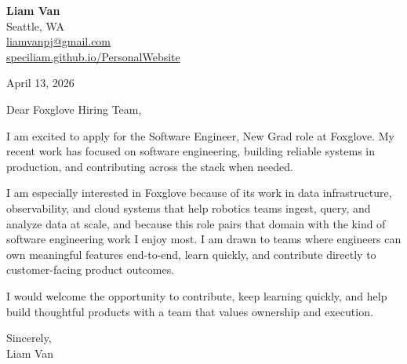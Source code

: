 \documentclass[letterpaper,11pt]{article}
\begin{document}
\begin{flushleft}
\textbf{\Large Liam Van} \\
Seattle, WA \\
\href{mailto:liamvanpj@gmail.com}{liamvanpj@gmail.com} \\
\href{https://speciliam.github.io/PersonalWebsite}{speciliam.github.io/PersonalWebsite}
\end{flushleft}

April 13, 2026

\noindent Dear Foxglove Hiring Team,

\noindent I am excited to apply for the Software Engineer, New Grad role at Foxglove. My recent work has focused on software engineering, building reliable systems in production, and contributing across the stack when needed.

\noindent I am especially interested in Foxglove because of its work in data infrastructure, observability, and cloud systems that help robotics teams ingest, query, and analyze data at scale, and because this role pairs that domain with the kind of software engineering work I enjoy most. I am drawn to teams where engineers can own meaningful features end-to-end, learn quickly, and contribute directly to customer-facing product outcomes.

\noindent I would welcome the opportunity to contribute, keep learning quickly, and help build thoughtful products with a team that values ownership and execution.

\noindent Sincerely, \\
Liam Van
\end{document}
